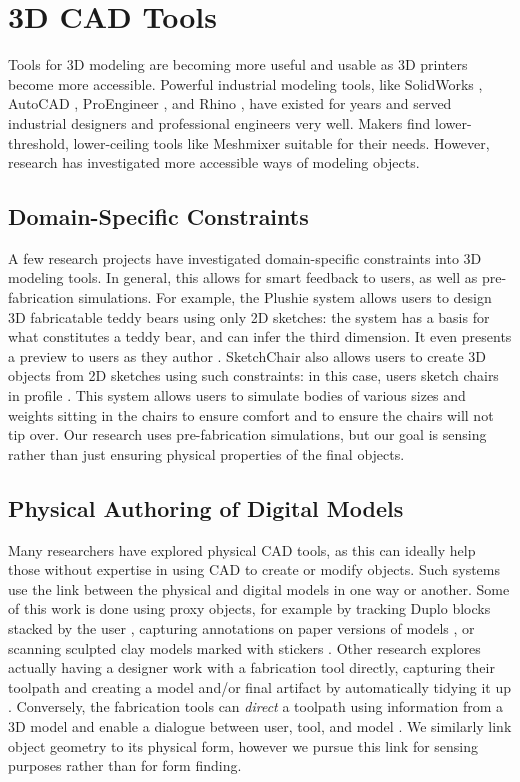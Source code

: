 \section{3D CAD Tools}
    Tools for 3D modeling are becoming more useful and usable as 3D printers become more accessible. Powerful industrial modeling tools, like SolidWorks \cite{solidworks}, AutoCAD \cite{autocad}, ProEngineer \cite{proe}, and Rhino \cite{rhino}, have existed for years and served industrial designers and professional engineers very well. Makers find lower-threshold, lower-ceiling tools like Meshmixer \cite{schmidt-meshmixer} suitable for their needs. However, research has investigated more accessible ways of modeling objects.

    \subsection{Domain-Specific Constraints}

    A few research projects have investigated domain-specific constraints into 3D modeling tools. In general, this allows for smart feedback to users, as well as pre-fabrication simulations. For example, the Plushie system \cite{mori-plushie} allows users to design 3D fabricatable teddy bears using only 2D sketches: the system has a basis for what constitutes a teddy bear, and can infer the third dimension. It even presents a preview to users as they author . SketchChair also allows users to create 3D objects from 2D sketches using such constraints: in this case, users sketch chairs in profile \cite{saul-sketchchair}. This system allows users to simulate bodies of various sizes and weights sitting in the chairs to ensure comfort and to ensure the chairs will not tip over. Our research uses pre-fabrication simulations, but our goal is sensing rather than just ensuring physical properties of the final objects.

    \subsection{Physical Authoring of Digital Models}

    Many researchers have explored physical CAD tools, as this can ideally help those without expertise in using CAD to create or modify objects. Such systems use the link between the physical and digital models in one way or another. Some of this work is done using proxy objects, for example by tracking Duplo blocks stacked by the user \cite{gupta-duplotrack}, capturing annotations on paper versions of models \cite{song-modelcraft-tochi}, or scanning sculpted clay models marked with stickers \cite{savage-mmarks}. Other research explores actually having a designer work with a fabrication tool directly, capturing their toolpath and creating a model and/or final artifact by automatically tidying it up \cite{willis-interactive, mueller-constructable, mueller-laserorigami}. Conversely, the fabrication tools can \emph{direct} a toolpath using information from a 3D model and enable a dialogue between user, tool, and model \cite{zoran-freed}. We similarly link object geometry to its physical form, however we pursue this link for sensing purposes rather than for form finding.

